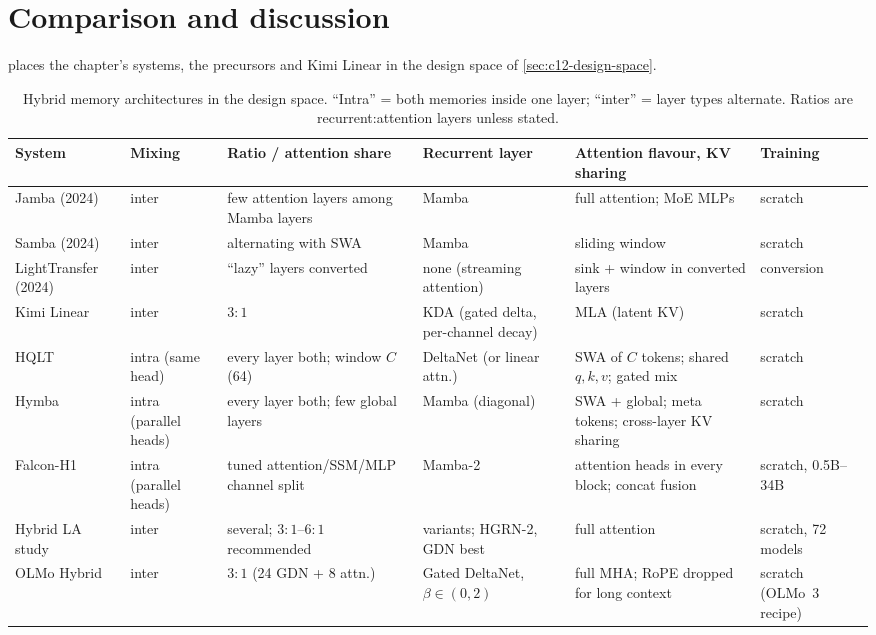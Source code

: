 \section{Comparison and discussion}\label{sec:c12-comparison}

 places the chapter's systems, the precursors and Kimi Linear in the
design space of \cref{sec:c12-design-space}.

\begin{table}[t]
\centering\scriptsize
\renewcommand{\arraystretch}{1.25}
\caption{Hybrid memory architectures in the design space. ``Intra'' = both memories inside one
layer; ``inter'' = layer types alternate. Ratios are recurrent:attention layers unless stated.}
\label{tab:c12-comparison}
\begin{tabularx}{\textwidth}{@{}>{\raggedright\arraybackslash}p{1.75cm}>{\raggedright\arraybackslash}p{1.25cm}>{\raggedright\arraybackslash}X>{\raggedright\arraybackslash}X>{\raggedright\arraybackslash}X>{\raggedright\arraybackslash}p{1.75cm}@{}}
\toprule
System & Mixing & Ratio / attention share & Recurrent layer & Attention flavour, KV sharing & Training \\
\midrule
Jamba (2024) & inter & few attention layers among Mamba layers & Mamba & full attention; MoE MLPs & scratch \\
Samba (2024) & inter & alternating with SWA & Mamba & sliding window & scratch \\
LightTransfer (2024) & inter & ``lazy'' layers converted & none (streaming attention) & sink + window in converted layers & conversion \\
\midrule
Kimi Linear & inter & $3{:}1$ & KDA (gated delta, per-channel decay) & MLA (latent KV) & scratch \\
HQLT & intra (same head) & every layer both; window $C$ (64) & DeltaNet (or linear attn.) & SWA of $C$ tokens; shared $q,k,v$; gated mix & scratch \\
Hymba & intra (parallel heads) & every layer both; few global layers & Mamba (diagonal) & SWA + global; meta tokens; cross-layer KV sharing & scratch \\
Falcon-H1 & intra (parallel heads) & tuned attention/SSM/MLP channel split & Mamba-2 & attention heads in every block; concat fusion & scratch, 0.5B--34B \\
Hybrid LA study & inter & several; $3{:}1$--$6{:}1$ recommended & 6 variants; HGRN-2, GDN best & full attention & scratch, 72 models \\
OLMo Hybrid & inter & $3{:}1$ (24 GDN + 8 attn.) & Gated DeltaNet, $\beta\in(0,2)$ & full MHA; RoPE dropped for long context & scratch (OLMo~3 recipe) \\

\end{tabularx}
\end{table}
